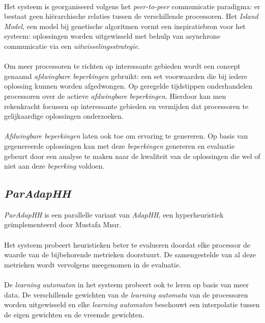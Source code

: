 \paragraph{}
Het systeem is georganiseerd volgens het \emph{peer-to-peer} communicatie paradigma: er bestaat geen hi\"erarchische relaties tussen de verschillende processoren. Het \emph{Island Model}, een model bij genetische algoritmen vormt een inspiratiebron voor het systeem: oplossingen worden uitgewisseld met behulp van asynchrone communicatie via een \emph{uitwisselingsstrategie}.

\paragraph{}
Om meer processoren te richten op interessante gebieden wordt een concept genaamd \emph{afdwingbare beperkingen} gebruikt: een set voorwaarden die bij iedere oplossing kunnen worden afgedwongen. Op geregelde tijdstippen onderhandelen processoren over de actieve \emph{afdwingbare beperkingen}. Hierdoor kan men rekenkracht focussen op interessante gebieden en vermijden dat processoren te gelijkaardige oplossingen onderzoeken.

\paragraph{}
\emph{Afdwingbare beperkingen} laten ook toe om ervaring te genereren. Op basis van gegenereerde oplossingen kan met deze \emph{beperkingen} genereren en evaluatie gebeurt door een analyse te maken naar de kwaliteit van de oplossingen die wel of niet aan deze \emph{beperking} voldoen.

\subsection{\emph{ParAdapHH}}

\emph{ParAdapHH} is een parallelle variant van \emph{AdapHH}, een hyperheuristiek ge\"implementeerd door Mustafa M\i{}s\i{}r.

\paragraph{}
Het systeem probeert heuristieken beter te evalueren doordat elke processor de waarde van de bijbehorende metrieken doorstuurt. De samengestelde van al deze metrieken wordt vervolgens meegenomen in de evaluatie.

\paragraph{}
De \emph{learning automaton} in het systeem probeert ook te leren op basis van meer data. De verschillende gewichten van de \emph{learning automata} van de processoren worden uitgewisseld en elke \emph{learning automaton} beschouwt een interpolatie tussen de eigen gewichten en de vreemde gewichten.

